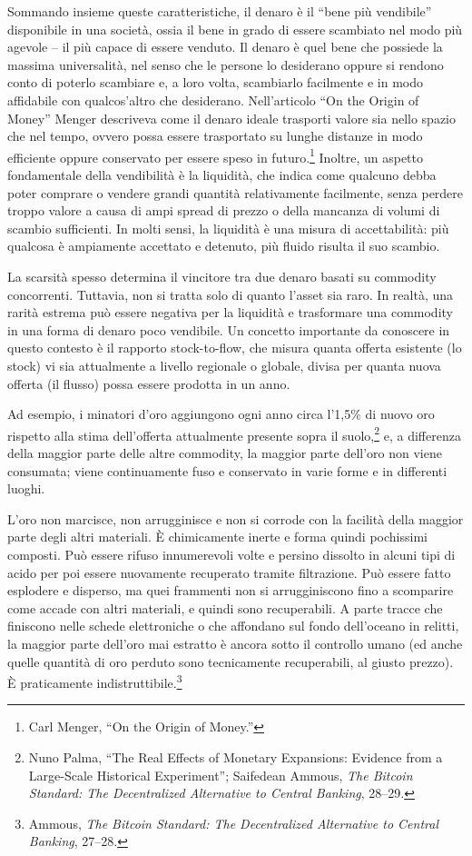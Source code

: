 \documentclass[
  a5paper,
  smalldemyvopaper,10pt,twoside,onecolumn,openright,extrafontsizes,hidelinks]{memoir}
\begin{document}
Sommando insieme queste caratteristiche, il denaro è il ``bene più
vendibile'' disponibile in una società, ossia il bene in grado di essere
scambiato nel modo più agevole -- il più capace di essere venduto. Il
denaro è quel bene che possiede la massima universalità, nel senso che
le persone lo desiderano oppure si rendono conto di poterlo scambiare e,
a loro volta, scambiarlo facilmente e in modo affidabile con
qualcos'altro che desiderano. Nell'articolo ``On the Origin of Money''
Menger descriveva come il denaro ideale trasporti valore sia nello
spazio che nel tempo, ovvero possa essere trasportato su lunghe distanze
in modo efficiente oppure conservato per essere speso in
futuro.\footnote{Carl Menger, ``On the Origin of Money.''} Inoltre, un
aspetto fondamentale della vendibilità è la liquidità, che indica come
qualcuno debba poter comprare o vendere grandi quantità relativamente
facilmente, senza perdere troppo valore a causa di ampi spread di prezzo
o della mancanza di volumi di scambio sufficienti. In molti sensi, la
liquidità è una misura di accettabilità: più qualcosa è ampiamente
accettato e detenuto, più fluido risulta il suo scambio.

La scarsità spesso determina il vincitore tra due denaro basati su
commodity concorrenti. Tuttavia, non si tratta solo di quanto l'asset
sia raro. In realtà, una rarità estrema può essere negativa per la
liquidità e trasformare una commodity in una forma di denaro poco
vendibile. Un concetto importante da conoscere in questo contesto è il
rapporto stock-to-flow, che misura quanta offerta esistente (lo stock)
vi sia attualmente a livello regionale o globale, divisa per quanta
nuova offerta (il flusso) possa essere prodotta in un anno.

Ad esempio, i minatori d'oro aggiungono ogni anno circa l'1,5\% di nuovo
oro rispetto alla stima dell'offerta attualmente presente sopra il
suolo,\footnote{Nuno Palma, ``The Real Effects of Monetary Expansions:
  Evidence from a Large-Scale Historical Experiment''; Saifedean Ammous,
  \emph{The Bitcoin Standard: The Decentralized Alternative to Central
  Banking}, 28--29.} e, a differenza della maggior parte delle altre
commodity, la maggior parte dell'oro non viene consumata; viene
continuamente fuso e conservato in varie forme e in differenti luoghi.

L'oro non marcisce, non arrugginisce e non si corrode con la facilità
della maggior parte degli altri materiali. È chimicamente inerte e forma
quindi pochissimi composti. Può essere rifuso innumerevoli volte e
persino dissolto in alcuni tipi di acido per poi essere nuovamente
recuperato tramite filtrazione. Può essere fatto esplodere e disperso,
ma quei frammenti non si arrugginiscono fino a scomparire come accade
con altri materiali, e quindi sono recuperabili. A parte tracce che
finiscono nelle schede elettroniche o che affondano sul fondo
dell'oceano in relitti, la maggior parte dell'oro mai estratto è ancora
sotto il controllo umano (ed anche quelle quantità di oro perduto sono
tecnicamente recuperabili, al giusto prezzo). È praticamente
indistruttibile.\footnote{Ammous, \emph{The Bitcoin Standard: The
  Decentralized Alternative to Central Banking}, 27--28.}
\end{document}
